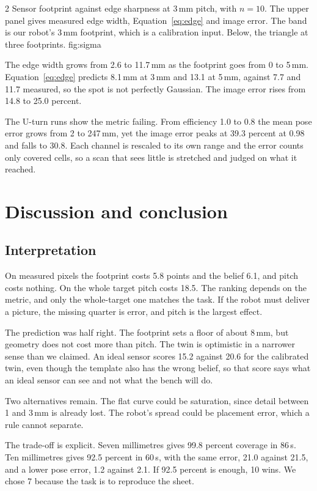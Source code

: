 \documentclass[a4paper,10pt]{article}
\begin{document}
\begin{multicols*}{2}
%
{Sensor footprint against edge sharpness at 3\,mm pitch, with $n=10$. The upper
panel gives measured edge width, Equation~\ref{eq:edge} and image error. The band
is our robot's 3\,mm footprint, which is a calibration input. Below, the triangle
at three footprints.}
{fig:sigma}

The edge width grows from 2.6 to 11.7\,mm as the footprint goes from 0 to 5\,mm.
Equation~\ref{eq:edge} predicts 8.1\,mm at 3\,mm and 13.1 at 5\,mm, against 7.7
and 11.7 measured, so the spot is not perfectly Gaussian. The image error rises
from 14.8 to 25.0 percent.

The U-turn runs show the metric failing. From efficiency 1.0 to 0.8 the mean pose
error grows from 2 to 247\,mm, yet the image error peaks at 39.3 percent at 0.98
and falls to 30.8. Each channel is rescaled to its own range and the error counts
only covered cells, so a scan that sees little is stretched and judged on what it
reached.

\section{Discussion and conclusion}
\subsection*{Interpretation}
On measured pixels the footprint costs 5.8 points and the belief 6.1, and pitch
costs nothing. On the whole target pitch costs 18.5. The ranking depends on the
metric, and only the whole-target one matches the task. If the robot must deliver
a picture, the missing quarter is error, and pitch is the largest effect.

The prediction was half right. The footprint sets a floor of about 8\,mm, but
geometry does not cost more than pitch. The twin is optimistic in a narrower sense
than we claimed. An ideal sensor scores 15.2 against 20.6 for the calibrated twin,
even though the template also has the wrong belief, so that score says what an
ideal sensor can see and not what the bench will do.

Two alternatives remain. The flat curve could be saturation, since detail between
1 and 3\,mm is already lost. The robot's spread could be placement error, which a
rule cannot separate.

The trade-off is explicit. Seven millimetres gives 99.8 percent coverage in 86\,s.
Ten millimetres gives 92.5 percent in 60\,s, with the same error, 21.0 against 21.5,
and a lower pose error, 1.2 against 2.1. If 92.5 percent is enough, 10 wins. We
chose 7 because the task is to reproduce the sheet.


\end{multicols*}
\end{document}
